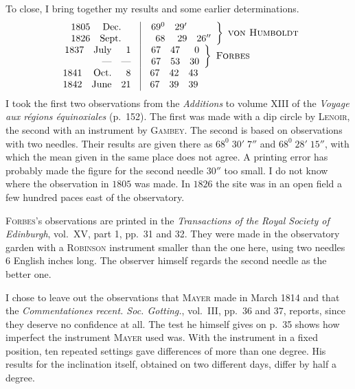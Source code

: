 To close, I bring together my results and some earlier determinations.
\[
\begin{array}{r|l}
\begin{array}{rrr}1805&\text{Dec.}&\\1826&\text{Sept.}&\end{array}&
\left.\begin{array}{rrr}69^0&29'&\\68&29&26''\end{array}\right\}\ \text{\textsc{von Humboldt}}\\
\begin{array}{rrr}1837&\text{July}&1\\&\text{—}&\text{—}\end{array}&
\left.\begin{array}{rrr}67&47&0\\67&53&30\end{array}\right\}\ \text{\textsc{Forbes}}\\
\begin{array}{rrr}1841&\text{Oct.}&8\\1842&\text{June}&21\end{array}&
\begin{array}{rrr}67&42&43\\67&39&39\end{array}
\end{array}
\]
I took the first two observations from the \textit{Additions} to volume XIII of the \textit{Voyage aux régions équinoxiales} (p.\ 152). The first was made with a dip circle by \textsc{Lenoir}, the second with an instrument by \textsc{Gambey}. The second is based on observations with two needles. Their results are given there as $68^0\;30'\;7''$ and $68^0\;28'\;15''$, with which the mean given in the same place does not agree. A printing error has probably made the figure for the second needle $30''$ too small. I do not know where the observation in $1805$ was made. In $1826$ the site was in an open field a few hundred paces east of the observatory.

\textsc{Forbes}'s observations are printed in the \textit{Transactions of the Royal Society of Edinburgh}, vol.\ XV, part 1, pp.\ 31 and 32. They were made in the observatory garden with a \textsc{Robinson} instrument smaller than the one here, using two needles $6$ English inches long. The observer himself regards the second needle as the better one.

I chose to leave out the observations that \textsc{Mayer} made in March 1814 and that the \textit{Commentationes recent. Soc. Gotting.}, vol.\ III, pp.\ 36 and 37, reports, since they deserve no confidence at all. The test he himself gives on p.\ 35 shows how imperfect the instrument \textsc{Mayer} used was. With the instrument in a fixed position, ten repeated settings gave differences of more than one degree. His results for the inclination itself, obtained on two different days, differ by half a degree.

